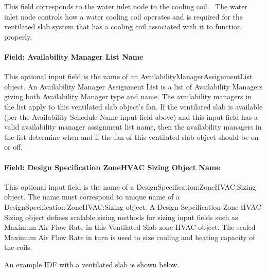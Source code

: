 This field corresponds to the water inlet node to the cooling coil.~ The water inlet node controls how a water cooling coil operates and is required for the ventilated slab system that has a cooling coil associated with it to function properly.

\paragraph{Field: Availability Manager List Name}\label{field-availability-manager-list-name-001}

This optional input field is the name of an AvailabilityManagerAssignmentList object. An Availability Manager Assignment List is a list of Availability Managers giving both Availability Manager type and name. The availability managers in the list apply to this ventilated slab object's fan. If the ventilated slab is available (per the Availability Schedule Name input field above) and this input field has a valid availability manager assignment list name, then the availability managers in the list determine when and if the fan of this ventilated slab object should be on or off.

\paragraph{Field: Design Specification ZoneHVAC Sizing Object Name}\label{field-design-specification-zonehvac-sizing-object-name}

This optional input field is the name of a DesignSpecification:ZoneHVAC:Sizing object. The name must correspond to unique name of a DesignSpecification:ZoneHVAC:Sizing object. A Design Sepcification Zone HVAC Sizing object defines scalable sizing methods for sizing input fields such as Maximum Air Flow Rate in this Ventilated Slab zone HVAC object. The scaled Maximum Air Flow Rate in turn is used to size cooling and heating capacity of the coils.

An example IDF with a ventilated slab is shown below.

